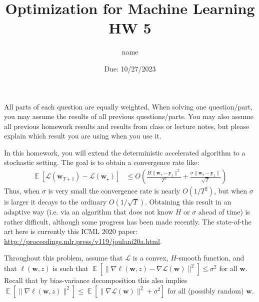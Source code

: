 \documentclass[letterpaper]{article}
\title{Optimization for Machine Learning HW 5}
\author{
name
}
\date{Due: 10/27/2023}
\newcommand{\E}{\mathop{\mathbb{E}}}
\renewcommand{\L}{\mathcal{L}}
\newcommand{\by}{\mathbf{y}}
\newcommand{\bw}{\mathbf{w}}
\begin{document}
\maketitle
All parts of each question are equally weighted. When solving one question/part, you may assume the results of all previous questions/parts. You may also assume all previous homework results and results from class or lecture notes, but please explain which result you are using when you use it.

In this homework, you will extend the deterministic accelerated algorithm to a stochastic setting. The goal is to obtain a convergence rate like:
\begin{align*}
    \E\left[\L(\bw_{T+1})-\L(\bw_\star)\right]&\le O\left(\frac{H \|\bw_\star - \by_1\|^2}{T^2} + \frac{\sigma \|\bw_\star - \by_1\|}{\sqrt{T}}\right)
\end{align*}
Thus, when $\sigma$ is very small the convergence rate is nearly $O(1/T^2)$, but when $\sigma$ is larger it decays to the ordinary $O(1/\sqrt{T})$. Obtaining this result in an adaptive way (i.e. via an algorithm that does not know $H$ or $\sigma$ ahead of time) is rather difficult, although some progress has been made recently. The state-of-the art here is currently this ICML 2020 paper: \url{http://proceedings.mlr.press/v119/joulani20a.html}.

Throughout this problem, assume that $\L$ is a convex, $H$-smooth function, and that $\ell(\bw ,z)$ is such that $\E[\|\nabla \ell(\bw,z)-\nabla \L(\bw)\|^2]\le \sigma^2$ for all $\bw$. Recall that by bias-variance decomposition this also implies $\E[\|\nabla\ell(\bw,z)\|^2]\le \E[\|\nabla \L(\bw)\|^2+\sigma^2]$ for all (possibly random) $\bw$.
\end{document}

